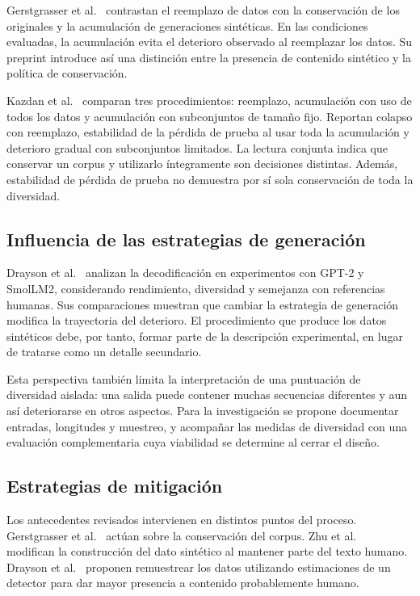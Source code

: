 \documentclass[12pt,letterpaper]{article}
\begin{document}
Gerstgrasser et al.\ \cite{gerstgrasser2024} contrastan el reemplazo de datos
con la conservación de los originales y la acumulación de generaciones
sintéticas. En las condiciones evaluadas, la acumulación evita el deterioro
observado al reemplazar los datos. Su preprint introduce así una distinción
entre la presencia de contenido sintético y la política de conservación.

Kazdan et al.\ \cite{kazdan2025} comparan tres procedimientos: reemplazo,
acumulación con uso de todos los datos y acumulación con subconjuntos de
tamaño fijo. Reportan colapso con reemplazo, estabilidad de la pérdida de
prueba al usar toda la acumulación y deterioro gradual con subconjuntos
limitados. La lectura conjunta indica que conservar un corpus y utilizarlo
íntegramente son decisiones distintas. Además, estabilidad de pérdida de
prueba no demuestra por sí sola conservación de toda la diversidad.

\subsection{Influencia de las estrategias de generación}

Drayson et al.\ \cite{drayson2025} analizan la decodificación en experimentos
con GPT-2 y SmolLM2, considerando rendimiento, diversidad y semejanza con
referencias humanas. Sus comparaciones muestran que cambiar la estrategia
de generación modifica la trayectoria del deterioro. El procedimiento
que produce los datos sintéticos debe, por tanto, formar parte de la
descripción experimental, en lugar de tratarse como un detalle secundario.

Esta perspectiva también limita la interpretación de una puntuación de
diversidad aislada: una salida puede contener muchas secuencias diferentes
y aun así deteriorarse en otros aspectos. Para la investigación se propone
documentar entradas, longitudes y muestreo, y acompañar las medidas de
diversidad con una evaluación complementaria cuya viabilidad se determine
al cerrar el diseño.

\subsection{Estrategias de mitigación}

Los antecedentes revisados intervienen en distintos puntos del proceso.
Gerstgrasser et al.\ \cite{gerstgrasser2024} actúan sobre la conservación
del corpus. Zhu et al.\ \cite{zhu2025} modifican la construcción del dato
sintético al mantener parte del texto humano. Drayson et al.\
\cite{drayson2025} proponen remuestrear los datos utilizando estimaciones
de un detector para dar mayor presencia a contenido probablemente humano.
\end{document}
